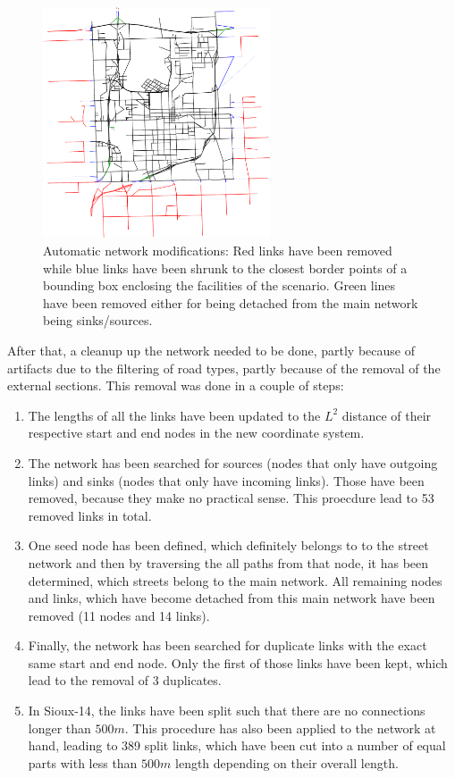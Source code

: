 \begin{figure}
    \centering
    \includegraphics[width=0.6\textwidth]{figures/sioux_step2_cropped.pdf}
    \caption{Automatic network modifications: Red links have been removed while
    blue links have been shrunk to the closest border points of a bounding box
    enclosing the facilities of the scenario. Green lines have been removed either
    for being detached from the main network being sinks/sources.}
    \label{fig:sioux_step2}
\end{figure}

After that, a cleanup up the network needed to be done, partly because of artifacts
due to the filtering of road types, partly because of the removal of the external
sections. This removal was done in a couple of steps:

\begin{enumerate}
\item The lengths of all the links have been updated to the $L^2$ distance of their
respective start and end nodes in the new coordinate system.
\item The network has been searched for sources (nodes that only have outgoing links)
and sinks (nodes that only have incoming links). Those have been removed, because they
make no practical sense. This proecdure lead to 53 removed links in total.
\item One seed node has been defined, which definitely belongs to to the street
network and then by traversing the all paths from that node, it has been determined,
which streets belong to the main network. All remaining nodes and links, which have
become detached from this main network have been removed (11 nodes and 14 links).
\item Finally, the network has been searched for duplicate links with the exact
same start and end node. Only the first of those links have been kept, which lead
to the removal of 3 duplicates.
\item In Sioux-14, the links have been split such that there are no connections
longer than $500m$. This procedure has also been applied to the network at hand,
leading to 389 split links, which have been cut into a number of equal parts
with less than $500m$ length depending on their overall length.
\end{enumerate}

